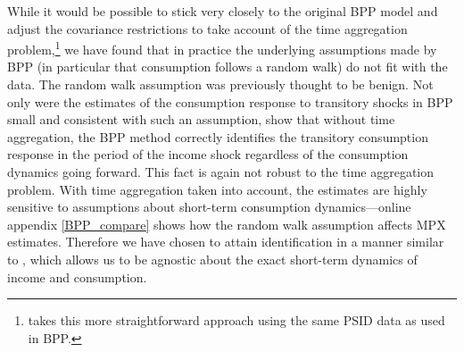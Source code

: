 \documentclass[titlepage]{\econtex}\newcommand{\texname}{ConsumptionHeterogeneity}
\begin{document}
	While it would be possible to stick very closely to the original BPP model and adjust the covariance restrictions to take account of the time aggregation problem,\footnote{ takes this more straightforward approach using the same PSID data as used in BPP.} we have found that in practice the underlying assumptions made by BPP (in particular that consumption follows a random walk) do not fit with the data. The random walk assumption was previously thought to be benign. Not only were the estimates of the consumption response to transitory shocks in BPP small and consistent with such an assumption,  show that without time aggregation, the BPP method correctly identifies the transitory consumption response in the period of the income shock regardless of the consumption dynamics going forward. This fact is again not robust to the time aggregation problem. With time aggregation taken into account, the estimates are highly sensitive to assumptions about short-term consumption dynamics---online appendix \ref{BPP_compare} shows how the random walk assumption affects MPX estimates. Therefore we have chosen to attain identification in a manner similar to , which allows us to be agnostic about the exact short-term dynamics of income and consumption.
	
\end{document}
